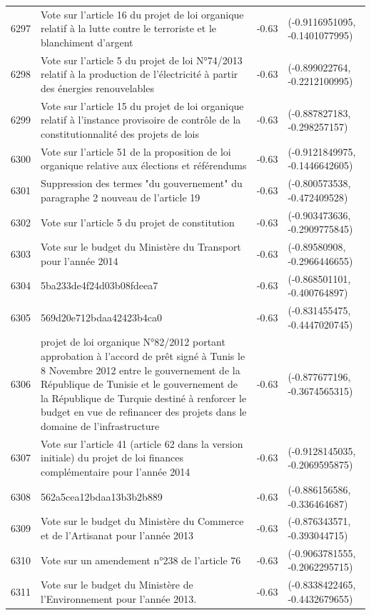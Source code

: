 \begin{table}[ht]
\begin{tabular}{rlrl}
  6297 & Vote sur l'article 16 du projet de loi organique relatif à la lutte contre le terroriste et le blanchiment d'argent & -0.63 & (-0.9116951095, -0.1401077995) \\ 
  6298 & Vote sur l'article 5 du projet de loi N°74/2013 relatif à la production de l'électricité à partir des énergies renouvelables & -0.63 & (-0.899022764, -0.2212100995) \\ 
  6299 & Vote sur l'article 15 du projet de loi organique relatif à l'instance provisoire de contrôle de la constitutionnalité des projets de lois & -0.63 & (-0.887827183, -0.298257157) \\ 
  6300 & Vote sur l'article 51 de la proposition de loi organique relative aux élections et référendums & -0.63 & (-0.9121849975, -0.1446642605) \\ 
  6301 & Suppression des termes "du gouvernement" du paragraphe 2 nouveau de l'article 19 & -0.63 & (-0.800573538, -0.472409528) \\ 
  6302 & Vote sur l'article 5 du projet de constitution & -0.63 & (-0.903473636, -0.2909775845) \\ 
  6303 & Vote sur le budget du Ministère du Transport pour l'année 2014 & -0.63 & (-0.89580908, -0.2966446655) \\ 
  6304 & 5ba233de4f24d03b08fdeea7 & -0.63 & (-0.868501101, -0.400764897) \\ 
  6305 & 569d20e712bdaa42423b4ca0 & -0.63 & (-0.831455475, -0.4447020745) \\ 
  6306 & projet de loi organique N°82/2012 portant approbation à l'accord de prêt signé à Tunis le 8 Novembre 2012 entre le gouvernement de la République de Tunisie  et le gouvernement de la République de Turquie destiné à renforcer le budget en vue de refinancer des projets dans le domaine de l’infrastructure & -0.63 & (-0.877677196, -0.3674565315) \\ 
  6307 & Vote sur l'article 41 (article 62 dans la version initiale) du projet de loi finances complémentaire pour l'année 2014 & -0.63 & (-0.9128145035, -0.2069595875) \\ 
  6308 & 562a5cea12bdaa13b3b2b889 & -0.63 & (-0.886156586, -0.336464687) \\ 
  6309 & Vote sur le budget du Ministère du Commerce et de l'Artisanat pour l'année 2013 & -0.63 & (-0.876343571, -0.393044715) \\ 
  6310 & Vote sur un amendement n°238 de l'article 76 & -0.63 & (-0.9063781555, -0.2062295715) \\ 
  6311 & Vote sur le budget du Ministère de l’Environnement pour l'année 2013. & -0.63 & (-0.8338422465, -0.4432679655) \\ 

\end{tabular}
\end{table}
